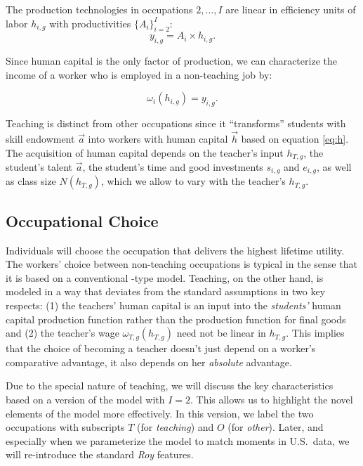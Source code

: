 \documentclass[onehalfspacing,11pt]{article}
\begin{document}
The production technologies in occupations $2,\ldots,I$ are linear in efficiency units of labor $h_{i,g}$ with productivities $\{A_i\}_{i=2}^I$:
\begin{equation}
\label{ }
y_{i,g} = A_i \times h_{i,g}.
\end{equation}

Since human capital is the only factor of production, we can characterize the income of a worker who is employed in a non-teaching job by:

\begin{equation}
\label{ }
\omega_{i} \left( h_{i,g} \right) = y_{i,g}.
\end{equation}

Teaching is distinct from other occupations since it ``transforms'' students with skill endowment $\vec{a}$ into workers with human capital $\vec{h}$ based on equation \eqref{eq:h}. The acquisition of human capital depends on the teacher's input $h_{T,g}$, the student's talent $\vec{a}$, the student's time and good investments $s_{i,g}$ and $e_{i,g}$, as well as class size $N(h_{T,g})$, which we allow to vary with the teacher's $h_{T,g}$.

\subsection{Occupational Choice}

Individuals will choose the occupation that delivers the highest lifetime utility. The workers' choice between non-teaching occupations is typical in the sense that it is based on a conventional \cite{Roy:1951}-type model. Teaching, on the other hand, is modeled in a way that deviates from the standard assumptions in two key respects: (1) the teachers' human capital is an input into the {\it students'} human capital production function rather than the production function for final goods and (2) the teacher's wage $\omega_{T,g}\left( h_{T,g} \right)$ need not be linear in $h_{T,g}$. This implies that the choice of becoming a teacher doesn't just depend on a worker's comparative advantage, it also depends on her {\it absolute} advantage.

Due to the special nature of teaching, we will discuss the key characteristics based on a version of the model with $I=2$. This allows us to highlight the novel elements of the model more effectively. In this version, we label the two occupations with subscripts $T$ (for {\it teaching}) and $O$ (for {\it other}). Later, and especially when we parameterize the model to match moments in U.S.~data, we will re-introduce the standard {\it Roy} features.
\end{document}
